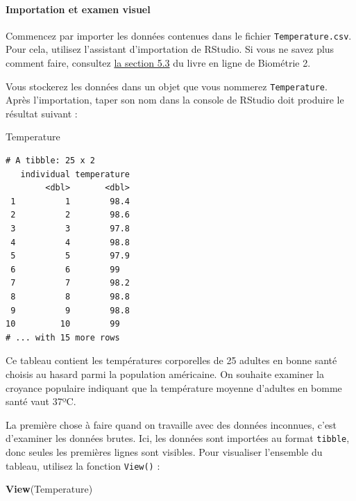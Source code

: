 \documentclass[a4paperpaper,]{article}
\newenvironment{Shaded}{\begin{snugshade}}{\end{snugshade}}
\newcommand{\KeywordTok}[1]{\textcolor[rgb]{0.12,0.11,0.11}{\textbf{#1}}}
\newcommand{\NormalTok}[1]{\textcolor[rgb]{0.12,0.11,0.11}{#1}}
\let\oldparagraph\paragraph
\renewcommand{\paragraph}[1]{\oldparagraph{#1}\mbox{}}
\begin{document}
\hypertarget{importation-et-examen-visuel}{%
\paragraph{Importation et examen visuel}\label{importation-et-examen-visuel}}

Commencez par importer les données contenues dans le fichier \texttt{Temperature.csv}. Pour cela, utilisez l'assistant d'importation de RStudio. Si vous ne savez plus comment faire, consultez \href{https://besibo.github.io/Biometrie2/tidyr.html\#importer-des-donnees-depuis-un-tableur}{la section 5.3} du livre en ligne de Biométrie 2.

Vous stockerez les données dans un objet que vous nommerez \texttt{Temperature}. Après l'importation, taper son nom dans la console de RStudio doit produire le résultat suivant :

\begin{Shaded}
\begin{Highlighting}[]
\NormalTok{Temperature}
\end{Highlighting}
\end{Shaded}

\begin{verbatim}
# A tibble: 25 x 2
   individual temperature
        <dbl>       <dbl>
 1          1        98.4
 2          2        98.6
 3          3        97.8
 4          4        98.8
 5          5        97.9
 6          6        99  
 7          7        98.2
 8          8        98.8
 9          9        98.8
10         10        99  
# ... with 15 more rows
\end{verbatim}

Ce tableau contient les températures corporelles de 25 adultes en bonne santé choisis au hasard parmi la population américaine. On souhaite examiner la croyance populaire indiquant que la température moyenne d'adultes en bomme santé vaut 37ºC.

La première chose à faire quand on travaille avec des données inconnues, c'est d'examiner les données brutes. Ici, les données sont importées au format \texttt{tibble}, donc seules les premières lignes sont visibles. Pour visualiser l'ensemble du tableau, utilisez la fonction \texttt{View()} :

\begin{Shaded}
\begin{Highlighting}[]
\KeywordTok{View}\NormalTok{(Temperature)}
\end{Highlighting}
\end{Shaded}
\end{document}
